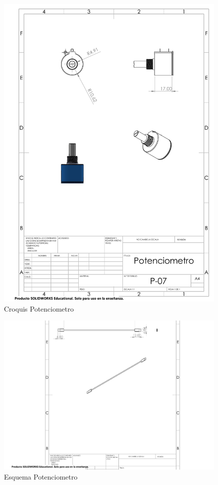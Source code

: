     \begin{figure}[H]
        \centering
        \includegraphics[trim = {10mm 10mm 10mm 10mm},clip,scale=0.05]{23/img/Potenciometro.pdf}
        \caption{Croquis Potenciometro}
        \label{fig:lcd-16x2}
    \end{figure}
    \begin{figure}[H]
        \centering
        \includegraphics[trim = {10mm 10mm 10mm 10mm},clip,scale=0.2]{23/img/cable usb c.pdf}
        \caption{Esquema Potenciometro}
        \label{fig:lcd-16x2}
    \end{figure}
